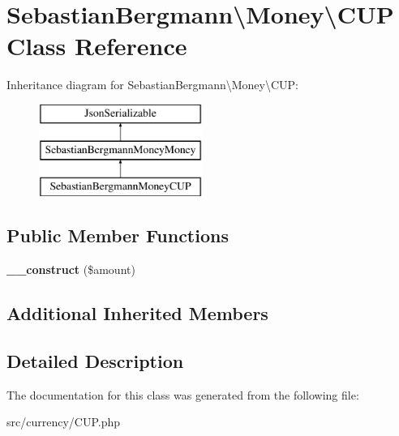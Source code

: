 \hypertarget{classSebastianBergmann_1_1Money_1_1CUP}{}\section{Sebastian\+Bergmann\textbackslash{}Money\textbackslash{}C\+U\+P Class Reference}
\label{classSebastianBergmann_1_1Money_1_1CUP}
Inheritance diagram for Sebastian\+Bergmann\textbackslash{}Money\textbackslash{}C\+U\+P\+:\begin{figure}[H]
\begin{center}
\leavevmode
\includegraphics[height=3.000000cm]{classSebastianBergmann_1_1Money_1_1CUP}
\end{center}
\end{figure}
\subsection*{Public Member Functions}
\begin{DoxyCompactItemize}
\item 
\hypertarget{classSebastianBergmann_1_1Money_1_1CUP_a51ea7898b68307680a5b0fa75d55a569}{}{\bfseries \+\_\+\+\_\+construct} (\$amount)\label{classSebastianBergmann_1_1Money_1_1CUP_a51ea7898b68307680a5b0fa75d55a569}

\end{DoxyCompactItemize}
\subsection*{Additional Inherited Members}


\subsection{Detailed Description}


The documentation for this class was generated from the following file\+:\begin{DoxyCompactItemize}
\item 
src/currency/C\+U\+P.\+php\end{DoxyCompactItemize}
